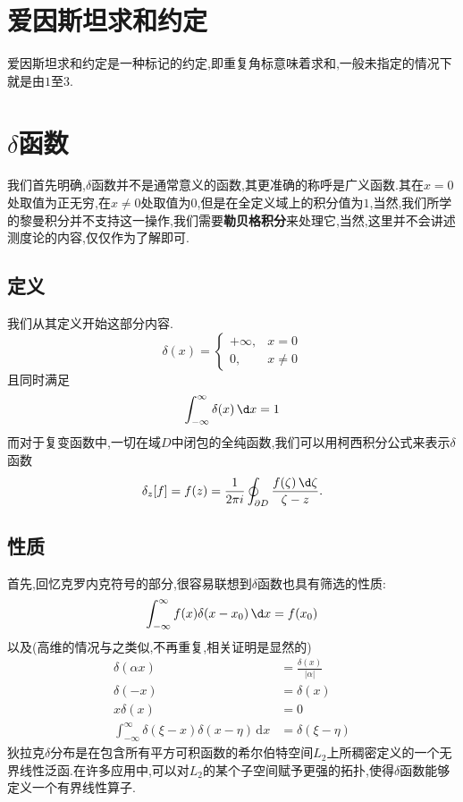 \documentclass[lang=cn,newtx,10pt,scheme=chinese,thmcnt=section]{elegantbook}
\begin{document}
\section{爱因斯坦求和约定}
爱因斯坦求和约定是一种标记的约定,即重复角标意味着求和,一般未指定的情况下就是由$1$至$3$.
\section{$\delta$函数}
我们首先明确,$\delta$函数并不是通常意义的函数,其更准确的称呼是广义函数.其在$x=0$处取值为正无穷,在$x\ne0$处取值为$0$,但是在全定义域上的积分值为$1$,当然,我们所学的黎曼积分并不支持这一操作,我们需要\textbf{勒贝格积分}来处理它,当然,这里并不会讲述测度论的内容,仅仅作为了解即可.
\subsection{定义}
我们从其定义开始这部分内容.
\begin{equation}
	\delta (x)={\begin{cases}+\infty ,&x=0\\0,&x\neq 0\end{cases}}
\end{equation}
且同时满足
\begin{equation}
	\int _{-\infty }^{\infty }\delta (x)\,\d x=1
\end{equation}
而对于复变函数中,一切在域$D$中闭包的全纯函数,我们可以用柯西积分公式来表示$\delta$函数
\begin{equation}
	\delta _{z}[f]=f(z)={\frac {1}{2\pi i}}\oint _{\partial D}{\frac {f(\zeta )\,\d\zeta }{\zeta -z}}.
\end{equation}
\subsection{性质}
首先,回忆克罗内克符号的部分,很容易联想到$\delta$函数也具有筛选的性质:
\begin{equation}
	\int _{-\infty }^{\infty }f(x)\delta (x-x_{0})\,\d x=f(x_{0})
\end{equation}
以及(高维的情况与之类似,不再重复,相关证明是显然的)
\begin{equation}
	\begin{aligned}
		\delta (\alpha x)&={\frac {\delta (x)}{|\alpha |}}\\
		\delta (-x)&=\delta (x)\\
		x\delta (x)&=0\\
		\int _{-\infty }^{\infty }\delta (\xi -x)\delta (x-\eta )\,\mathrm {d} x&=\delta (\xi -\eta )
	\end{aligned}
\end{equation}
狄拉克$\delta$分布是在包含所有平方可积函数的希尔伯特空间$L_2$上所稠密定义的一个无界线性泛函.在许多应用中,可以对$L_2$的某个子空间赋予更强的拓扑,使得$\delta$函数能够定义一个有界线性算子.
\end{document}
